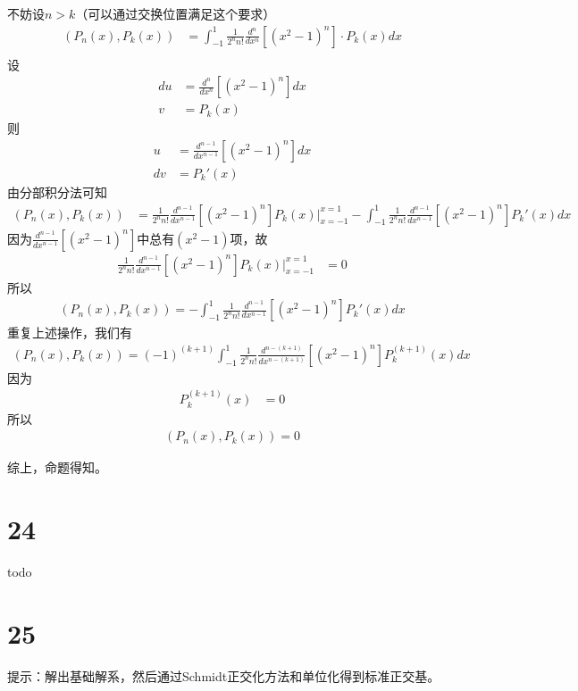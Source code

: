 \documentclass{article}
\begin{document}
不妨设$n > k$（可以通过交换位置满足这个要求）
\begin{align*}
  (P_{n}(x), P_k(x))
   & = \int_{-1}^{1} \frac{1}{2^n n!} \frac{d^n}{d x^n}[(x^2 - 1)^n] \cdot P_k(x) dx \\
\end{align*}
设
\begin{align*}
  du & = \frac{d^n}{d x^n}[(x^2 - 1)^n] dx \\
  v  & = P_k(x)
\end{align*}
则
\begin{align*}
  u  & = \frac{d^{n - 1}}{d x^{n - 1}}[(x^2 - 1)^n] dx \\
  dv & = P_k'(x)
\end{align*}
由分部积分法可知
\begin{align*}
  (P_{n}(x), P_k(x))
   & = \frac{1}{2^n n!} \frac{d^{n - 1}}{d x^{n - 1}}[(x^2 - 1)^n] P_k(x) \bigg|_{x = -1}^{x = 1}
  -  \int_{-1}^{1} \frac{1}{2^n n!} \frac{d^{n - 1}}{d x^{n - 1}}[(x^2 - 1)^n] P_k'(x) dx
\end{align*}
因为$\frac{d^{n - 1}}{d x^{n - 1}}[(x^2 - 1)^n]$中总有$(x^2 - 1)$项，故
\begin{align*}
  \frac{1}{2^n n!} \frac{d^{n - 1}}{d x^{n - 1}}[(x^2 - 1)^n] P_k(x) \bigg|_{x = -1}^{x = 1}
   & = 0
\end{align*}
所以
\begin{align*}
  (P_{n}(x), P_k(x)) = -  \int_{-1}^{1} \frac{1}{2^n n!} \frac{d^{n - 1}}{d x^{n - 1}}[(x^2 - 1)^n] P_k'(x) dx
\end{align*}
重复上述操作，我们有
\begin{align*}
  (P_{n}(x), P_k(x)) = (-1)^{(k+1)}  \int_{-1}^{1} \frac{1}{2^n n!} \frac{d^{n - (k+1)}}{d x^{n - (k+1)}}[(x^2 - 1)^n] P_k^{(k+1)}(x) dx
\end{align*}
因为
\begin{align*}
  P_k^{(k+1)}(x)
   & = 0
\end{align*}
所以
\begin{align*}
  (P_{n}(x), P_k(x)) = 0
\end{align*}

综上，命题得知。

\section*{24}

todo

\section*{25}

提示：解出基础解系，然后通过Schmidt正交化方法和单位化得到标准正交基。
\end{document}
